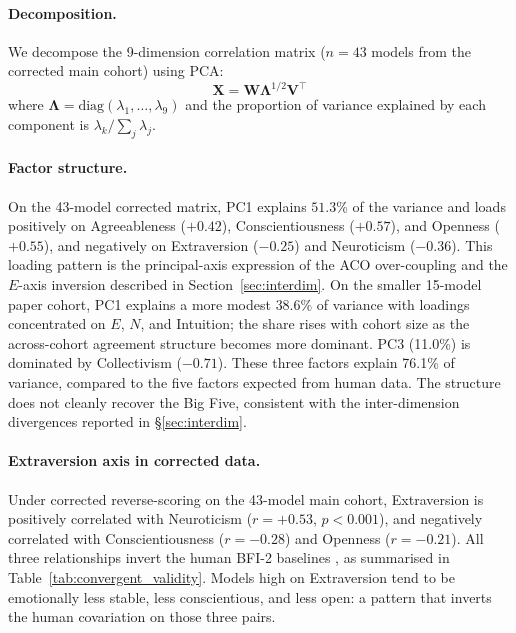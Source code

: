 \documentclass[11pt]{article}
\begin{document}
\paragraph{Decomposition.}
We decompose the 9-dimension correlation matrix ($n = 43$ models from the corrected main cohort) using PCA:
\begin{equation}
\mathbf{X} = \mathbf{W}\mathbf{\Lambda}^{1/2}\mathbf{V}^\top
\end{equation}
where $\mathbf{\Lambda} = \text{diag}(\lambda_1, \ldots, \lambda_9)$ and the proportion of variance explained by each component is $\lambda_k / \sum_j \lambda_j$.

\paragraph{Factor structure.}
On the 43-model corrected matrix, PC1 explains $51.3\%$ of the variance and loads positively on Agreeableness ($+0.42$), Conscientiousness ($+0.57$), and Openness ($+0.55$), and negatively on Extraversion ($-0.25$) and Neuroticism ($-0.36$).
This loading pattern is the principal-axis expression of the ACO over-coupling and the $E$-axis inversion described in Section~\ref{sec:interdim}.
On the smaller 15-model paper cohort, PC1 explains a more modest $38.6\%$ of variance with loadings concentrated on $E$, $N$, and Intuition; the share rises with cohort size as the across-cohort agreement structure becomes more dominant.
PC3 (11.0\%) is dominated by Collectivism ($-0.71$).
These three factors explain 76.1\% of variance, compared to the five factors expected from human data.
The structure does not cleanly recover the Big Five, consistent with the inter-dimension divergences reported in \S\ref{sec:interdim}.

\paragraph{Extraversion axis in corrected data.}
Under corrected reverse-scoring on the 43-model main cohort, Extraversion is positively correlated with Neuroticism ($r = +0.53$, $p < 0.001$), and negatively correlated with Conscientiousness ($r = -0.28$) and Openness ($r = -0.21$).
All three relationships invert the human BFI-2 baselines \citep{soto2017bfi2}, as summarised in Table~\ref{tab:convergent_validity}.
Models high on Extraversion tend to be emotionally less stable, less conscientious, and less open: a pattern that inverts the human covariation on those three pairs.
\end{document}
